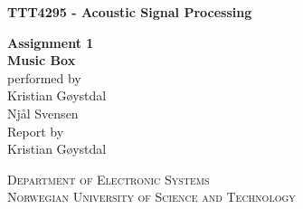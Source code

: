 \documentclass[english]{report}
\begin{document}
\pagestyle{empty} %
\newcommand{\HRule}{\rule{\linewidth}{1mm}}
\begin{center}
\end{center}

\begin{center}
\textbf {TTT4295 - Acoustic Signal Processing}
\end{center}


\begin{center}
  \large
  \textbf{Assignment 1}\\
  \huge
  \textbf{Music Box\\}
  \small
  \noindent performed by \\
  \large
  \noindent Kristian Gøystdal\\Njål Svensen\\ 
  \small
  \noindent Report by \\
  \large
  \noindent Kristian Gøystdal\\
\end{center}

\begin{center}
\textsc{Department of Electronic Systems}\\
\textsc{Norwegian University of Science and Technology}
\end{center}

\cleardoublepage
{} 


\cleardoublepage
{}
\pagestyle{plain}



\tableofcontents
\cleardoublepage
{}











\appendix

% 
\end{document}

